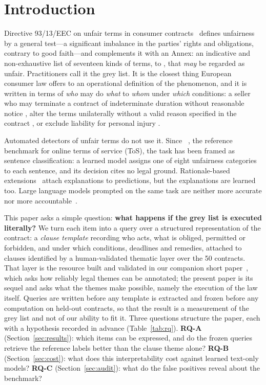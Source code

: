 \section{Introduction}
\label{sec:intro}
Directive 93/13/EEC on unfair terms in consumer contracts~\cite{eu1993directive} defines unfairness by a general test---a significant imbalance in the parties' rights and obligations, contrary to good faith---and complements it with an Annex: an indicative and non-exhaustive list of seventeen kinds of terms,  to , that \emph{may} be regarded as unfair. Practitioners call it the grey list. It is the closest thing European consumer law offers to an operational definition of the phenomenon, and it is written in terms of \emph{who} may do \emph{what} to \emph{whom} under \emph{which} conditions: a seller who may terminate a contract of indeterminate duration without reasonable notice , alter the terms unilaterally without a valid reason specified in the contract , or exclude liability for personal injury .

Automated detectors of unfair terms do not use it. Since \corpus{}~\cite{lippi2019claudette}, the reference benchmark for online terms of service (ToS), the task has been framed as sentence classification: a learned model assigns one of eight unfairness categories to each sentence, and its decision cites no legal ground. Rationale-based extensions~\cite{ruggeri2022memory,liepina2020claudettetool} attach explanations to predictions, but the explanations are learned too. Large language models prompted on the same task are neither more accurate nor more accountable~\cite{panarelli2025worth,frasheri2024llm}.

This paper asks a simple question: \textbf{what happens if the grey list is executed literally?} We turn each item into a query over a structured representation of the contract: a \emph{clause template} recording who acts, what is obliged, permitted or forbidden, and under which conditions, deadlines and remedies, attached to clauses identified by a human-validated thematic layer over the 50 \corpus{} contracts. That layer is the resource built and validated in our companion short paper~\cite{elazhar2026thematic}, which asks how reliably legal themes can be annotated; the present paper is its sequel and asks what the themes make possible, namely the execution of the law itself. Queries are written before any template is extracted and frozen before any computation on held-out contracts, so that the result is a measurement of the grey list and not of our ability to fit it. Three questions structure the paper, each with a hypothesis recorded in advance (Table~\ref{tab:rq}). \textbf{RQ-A} (Section~\ref{sec:results}): which items can be expressed, and do the frozen queries retrieve the reference labels better than the clause theme alone? \textbf{RQ-B} (Section~\ref{sec:cost}): what does this interpretability cost against learned text-only models? \textbf{RQ-C} (Section~\ref{sec:audit}): what do the false positives reveal about the benchmark?

